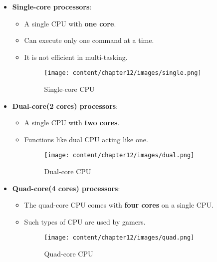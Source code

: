 \setlength{\columnsep}{3pt}
\begin{flushleft}

\begin{itemize}
	\item \textbf{Single-core processors}: 
	\begin{itemize}
		\item A single CPU with \textbf{one core}.
		\item Can execute only one command at a time.
		\item It is not efficient in multi-tasking.
		\begin{figure}[h!]
			\centering
			\texttt{[image: content/chapter12/images/single.png]}
			\caption{Single-core CPU}
			\label{fig:single-core1}
		\end{figure}
	\end{itemize}
	
	\bigskip
	
	\item \textbf{Dual-core(2 cores) processors}:
	\begin{itemize}
		\item A single CPU with \textbf{two cores}.
		\item Functions like dual CPU acting like one. 
		\begin{figure}[h!]
			\centering
			\texttt{[image: content/chapter12/images/dual.png]}
			\caption{Dual-core CPU}
			\label{fig:single-core2}
		\end{figure}
	\end{itemize}
	\newpage
	\item \textbf{Quad-core(4 cores) processors}:
	\begin{itemize}
		\item The quad-core CPU comes with \textbf{four cores} on a single CPU. 
		\item Such types of CPU are used by gamers.
		\begin{figure}[h!]
			\centering
			\texttt{[image: content/chapter12/images/quad.png]}
			\caption{Quad-core CPU}
			\label{fig:single-core3}
		\end{figure}
	\end{itemize}			
	
	\bigskip
	

\end{itemize}
\end{flushleft}
